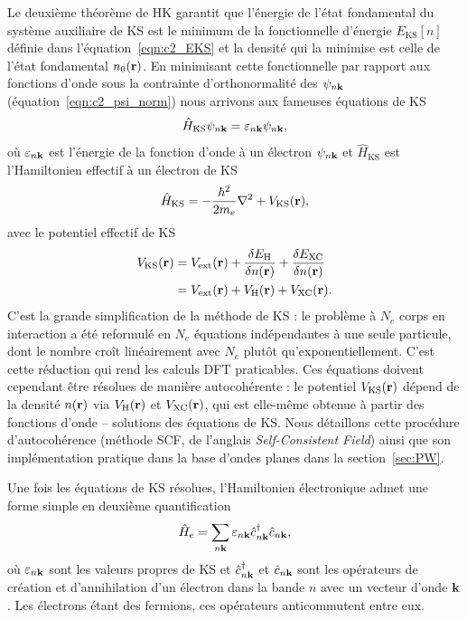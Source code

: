 \bigskip
{}

Le deuxième théorème de HK garantit que l'énergie de l'état fondamental du système auxiliaire de KS est le minimum de la fonctionnelle d'énergie $E_\text{KS}[n]$ définie dans l'équation~\eqref{eqn:c2_EKS} et la densité qui la minimise est celle de l'état fondamental $n_0(\mathbf{r})$. En minimisant cette fonctionnelle par rapport aux fonctions d'onde sous la contrainte d'orthonormalité des $\psi_{n\mathbf{k}}$ (équation~\eqref{eqn:c2_psi_norm}) nous arrivons aux fameuses équations de KS
\begin{equation}
    \label{eqn:c2_KS}
    \hat{H}_\text{KS}\psi_{n\mathbf{k}}=\varepsilon_{n\mathbf{k}}\psi_{n\mathbf{k}},
\end{equation}
où $\varepsilon_{n\mathbf{k}}$ est l'énergie de la fonction d'onde à un électron $\psi_{n\mathbf{k}}$ et $\hat{H}_\text{KS}$ est l'Hamiltonien effectif à un électron de KS
\begin{equation}
    \label{eqn:c2_HKS}
    \hat{H}_\text{KS}=-\frac{\hbar^2}{2m_e}\nabla^2+V_\text{KS}(\mathbf{r}),
\end{equation}
avec le potentiel effectif de KS
\begin{align}
    \label{eqn:c2_VKS}
    V_\text{KS}(\mathbf{r})&=V_\text{ext}(\mathbf{r})+\frac{\delta E_\text{H}}{\delta n(\mathbf{r})}+\frac{\delta E_\text{XC}}{\delta n(\mathbf{r})}\notag\\
    &=V_\text{ext}(\mathbf{r})+V_\text{H}(\mathbf{r})+V_\text{XC}(\mathbf{r}).
\end{align}
C'est la grande simplification de la méthode de KS : le problème à $N_e$ corps en interaction a été reformulé en $N_e$ équations indépendantes à une seule particule, dont le nombre croît linéairement avec $N_e$ plutôt qu'exponentiellement. C'est cette réduction qui rend les calculs DFT praticables. Ces équations doivent cependant être résolues de manière autocohérente : le potentiel $V_\text{KS}(\mathbf{r})$ dépend de la densité $n(\mathbf{r})$ via $V_\text{H}(\mathbf{r})$ et $V_\text{XC}(\mathbf{r})$, qui est elle-même obtenue à partir des fonctions d'onde -- solutions des équations de KS. Nous détaillons cette procédure d'autocohérence (méthode SCF, de l'anglais \textit{Self-Consistent Field}) ainsi que son implémentation pratique dans la base d'ondes planes dans la section~\ref{sec:PW}.

Une fois les équations de KS résolues, l'Hamiltonien électronique admet une forme simple en deuxième quantification
\begin{equation}
    \hat{H}_e = \sum_{n\mathbf{k}}\varepsilon_{n\mathbf{k}}\hat{c}^\dag_{n\mathbf{k}}\hat{c}_{n\mathbf{k}},
\end{equation}
où $\varepsilon_{n\mathbf{k}}$ sont les valeurs propres de KS et $\hat{c}^\dag_{n\mathbf{k}}$ et $\hat{c}_{n\mathbf{k}}$ sont les opérateurs de création et d'annihilation d'un électron dans la bande $n$ avec un vecteur d'onde $\mathbf{k}$. Les électrons étant des fermions, ces opérateurs anticommutent entre eux.

